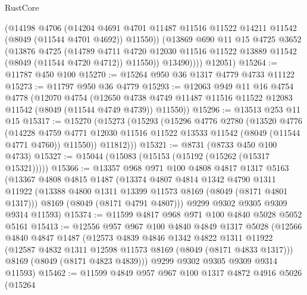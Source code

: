 \begin{lexlean}{RustCore}
\begin{coremodule}
            (@14198
              @4706
              (@14204
                @4691
                @4701
                @11487
                @11516
                @11522
                @14211
                @11542
                (@8049 (@11544 @4701 @4692))
                @11550))
            (@13869
              @690
              @11
              @15
              @4725
              @3652
              (@13876
                @4725
                (@14789
                  @4711
                  @4720
                  @12030
                  @11516
                  @11522
                  @13889
                  @11542
                  (@8049 (@11544 @4720 @4712))
                  @11550))
              @13490))))
      @12051)
@15264 := @11787 @450 @100
@15270 := @15264 @950 @36 @1317 @4779 @4733 @11122
@15273 := @11797 @950 @36 @4779
@15293 := @12063
    @949
    @11
    @16
    @4754
    @4778
    (@12070
      @4754
      (@12650 @4738 @4749 @11487 @11516 @11522 @12083 @11542 (@8049 (@11544 @4749 @4739)) @11550))
@15296 := @13513 @253 @11 @15
@15317 := @15270
    (@15273
      (@15293
        (@15296
          @4776
          @2780
          (@13520
            @4776
            (@14228
              @4759
              @4771
              @12030
              @11516
              @11522
              @13533
              @11542
              (@8049 (@11544 @4771 @4760))
              @11550))
          @11812)))
@15321 := @8731 (@8733 @450 @100 @4733)
@15327 := @15044 (@15083 (@15153 (@15192 (@15262 (@15317 @15321)))))
@15366 := @13357
    @968
    @971
    @100
    @4808
    @4817
    @1317
    @5163
    (@13367
      @4808
      @4815
      @1487
      (@13374
        @4807
        @4814
        @1342
        @4790
        @1311
        @11922
        (@13388 @4800 @1311 @13399 @11573 @8169 (@8049 (@8171 @4801 @1317)))
        @8169
        (@8049 (@8171 @4791 @4807)))
      @9299
      @9302
      @9305
      @9309
      @9314
      @11593)
@15374 := @11599 @4817 @968 @971 @100 @4840 @5028 @5052 @5161
@15413 := @12556
    @957
    @967
    @100
    @4840
    @4849
    @1317
    @5028
    (@12566
      @4840
      @4847
      @1487
      (@12573
        @4839
        @4846
        @1342
        @4822
        @1311
        @11922
        (@12587 @4832 @1311 @12598 @11573 @8169 (@8049 (@8171 @4833 @1317)))
        @8169
        (@8049 (@8171 @4823 @4839)))
      @9299
      @9302
      @9305
      @9309
      @9314
      @11593)
@15462 := @11599
    @4849
    @957
    @967
    @100
    @1317
    @4872
    @4916
    @5026
    (@15264

\end{coremodule}
\end{lexlean}
